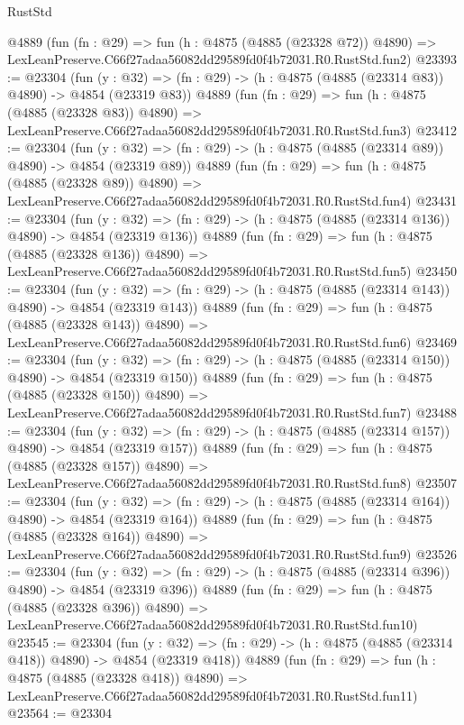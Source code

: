 \begin{lexlean}{RustStd}
\begin{coremodule}
    @4889
    (fun (fn : @29) =>
    fun (h : @4875 (@4885 (@23328 @72)) @4890) =>
    LexLeanPreserve.C66f27adaa56082dd29589fd0f4b72031.R0.RustStd.fun2)
@23393 := @23304
    (fun (y : @32) => (fn : @29) -> (h : @4875 (@4885 (@23314 @83)) @4890) -> @4854 (@23319 @83))
    @4889
    (fun (fn : @29) =>
    fun (h : @4875 (@4885 (@23328 @83)) @4890) =>
    LexLeanPreserve.C66f27adaa56082dd29589fd0f4b72031.R0.RustStd.fun3)
@23412 := @23304
    (fun (y : @32) => (fn : @29) -> (h : @4875 (@4885 (@23314 @89)) @4890) -> @4854 (@23319 @89))
    @4889
    (fun (fn : @29) =>
    fun (h : @4875 (@4885 (@23328 @89)) @4890) =>
    LexLeanPreserve.C66f27adaa56082dd29589fd0f4b72031.R0.RustStd.fun4)
@23431 := @23304
    (fun (y : @32) => (fn : @29) -> (h : @4875 (@4885 (@23314 @136)) @4890) -> @4854 (@23319 @136))
    @4889
    (fun (fn : @29) =>
    fun (h : @4875 (@4885 (@23328 @136)) @4890) =>
    LexLeanPreserve.C66f27adaa56082dd29589fd0f4b72031.R0.RustStd.fun5)
@23450 := @23304
    (fun (y : @32) => (fn : @29) -> (h : @4875 (@4885 (@23314 @143)) @4890) -> @4854 (@23319 @143))
    @4889
    (fun (fn : @29) =>
    fun (h : @4875 (@4885 (@23328 @143)) @4890) =>
    LexLeanPreserve.C66f27adaa56082dd29589fd0f4b72031.R0.RustStd.fun6)
@23469 := @23304
    (fun (y : @32) => (fn : @29) -> (h : @4875 (@4885 (@23314 @150)) @4890) -> @4854 (@23319 @150))
    @4889
    (fun (fn : @29) =>
    fun (h : @4875 (@4885 (@23328 @150)) @4890) =>
    LexLeanPreserve.C66f27adaa56082dd29589fd0f4b72031.R0.RustStd.fun7)
@23488 := @23304
    (fun (y : @32) => (fn : @29) -> (h : @4875 (@4885 (@23314 @157)) @4890) -> @4854 (@23319 @157))
    @4889
    (fun (fn : @29) =>
    fun (h : @4875 (@4885 (@23328 @157)) @4890) =>
    LexLeanPreserve.C66f27adaa56082dd29589fd0f4b72031.R0.RustStd.fun8)
@23507 := @23304
    (fun (y : @32) => (fn : @29) -> (h : @4875 (@4885 (@23314 @164)) @4890) -> @4854 (@23319 @164))
    @4889
    (fun (fn : @29) =>
    fun (h : @4875 (@4885 (@23328 @164)) @4890) =>
    LexLeanPreserve.C66f27adaa56082dd29589fd0f4b72031.R0.RustStd.fun9)
@23526 := @23304
    (fun (y : @32) => (fn : @29) -> (h : @4875 (@4885 (@23314 @396)) @4890) -> @4854 (@23319 @396))
    @4889
    (fun (fn : @29) =>
    fun (h : @4875 (@4885 (@23328 @396)) @4890) =>
    LexLeanPreserve.C66f27adaa56082dd29589fd0f4b72031.R0.RustStd.fun10)
@23545 := @23304
    (fun (y : @32) => (fn : @29) -> (h : @4875 (@4885 (@23314 @418)) @4890) -> @4854 (@23319 @418))
    @4889
    (fun (fn : @29) =>
    fun (h : @4875 (@4885 (@23328 @418)) @4890) =>
    LexLeanPreserve.C66f27adaa56082dd29589fd0f4b72031.R0.RustStd.fun11)
@23564 := @23304

\end{coremodule}
\end{lexlean}
